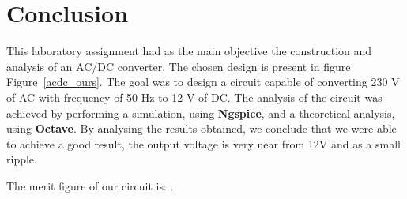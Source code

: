 \section{Conclusion}
\label{sec:conclusion}

This laboratory assignment had as the main objective the construction and analysis of an AC/DC converter. The chosen design is present in figure Figure~\ref{acdc_ours}. The goal was to design a circuit capable of converting 230 V of AC with frequency of 50 Hz to 12 V of DC. The analysis of the circuit was achieved by performing a simulation, using {\bf Ngspice}, and a theoretical analysis, using {\bf Octave}. By analysing the results obtained, we conclude that we were able to achieve a good result, the output voltage is very near from 12V and as a small ripple. 

The merit figure of our circuit is: .


